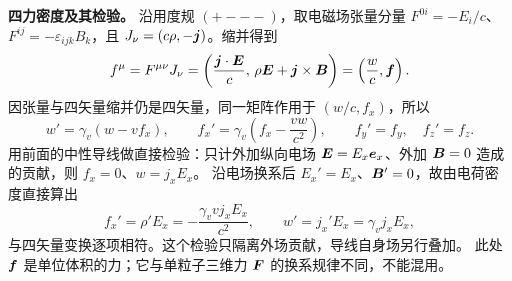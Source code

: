 \noindent\textbf{四力密度及其检验。}
沿用度规 $(+---)$，取电磁场张量分量
$F^{0i}=-E_i/c$、$F^{ij}=-\varepsilon_{ijk}B_k$，且
$J_\nu=(c\rho,-\bm{j})$。缩并得到
\[
 f^\mu=F^{\mu\nu}J_\nu
 =\left(\frac{\bm{j}\cdot\bm{E}}{c},\,
 \rho\bm{E}+\bm{j}\times\bm{B}\right)
 =\left(\frac wc,\bm{f}\right).
\]
因张量与四矢量缩并仍是四矢量，同一矩阵作用于 $(w/c,f_x)$，所以
\[
 \boxed{w'=\gamma_v(w-vf_x),\qquad
 f_x'=\gamma_v\left(f_x-\frac{vw}{c^2}\right)},\qquad
 f_y'=f_y,\quad f_z'=f_z.
\]
用前面的中性导线做直接检验：只计外加纵向电场 $\bm{E}=E_x\bm{e}_x$、外加 $\bm{B}=0$
造成的贡献，则 $f_x=0$、$w=j_xE_x$。
沿电场换系后 $E_x'=E_x$、$\bm{B}'=0$，故由电荷密度直接算出
\[
 f_x'=\rho'E_x=-\frac{\gamma_vv j_xE_x}{c^2},\qquad
 w'=j_x'E_x=\gamma_vj_xE_x,
\]
与四矢量变换逐项相符。这个检验只隔离外场贡献，导线自身场另行叠加。
此处 $\bm{f}$ 是单位体积的力；它与单粒子三维力 $\bm{F}$ 的换系规律不同，不能混用。
